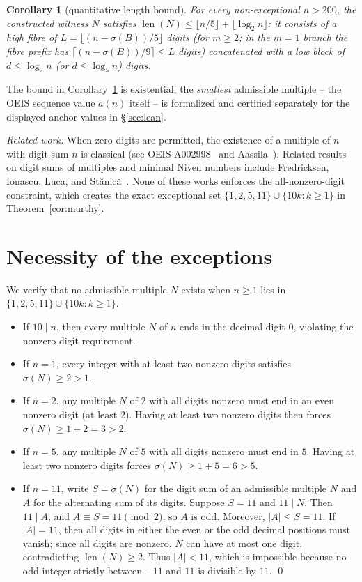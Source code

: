 \documentclass[11pt]{article}
\newtheorem{corollary}[theorem]{Corollary}
\theoremstyle{remark}
\newcommand{\sig}{\sigma}
\begin{document}
\begin{corollary}[quantitative length bound]
\label{cor:quant}
For every non-exceptional $n > 200$, the constructed witness $N$ satisfies
$\operatorname{len}(N) \le \lfloor n/5 \rfloor + \lfloor \log_2 n \rfloor$:
it consists of a high fibre of $L = \lfloor (n-\sig(B))/5 \rfloor$ digits
(for $m \ge 2$; in the $m = 1$ branch the fibre prefix has
$\lceil (n-\sig(B))/9 \rceil \le L$ digits)
concatenated with a low block of $d \le \log_2 n$ (or $d \le \log_5 n$) digits.
\end{corollary}

The bound in Corollary~\ref{cor:quant} is existential; the \emph{smallest}
admissible multiple -- the OEIS sequence value $a(n)$ itself -- is formalized
and certified separately for the displayed anchor values in \S\ref{sec:lean}.

\emph{Related work.} When zero digits are permitted, the existence of a
multiple of $n$ with digit sum $n$ is classical (see OEIS A002998~\cite{a002998}
and Aassila~\cite{aassila}). Related results on digit sums of multiples and
minimal Niven numbers include Fredricksen, Ionascu, Luca, and
St\u{a}nic\u{a}~\cite{fils}. None of these works enforces the all-nonzero-digit
constraint, which creates the exact exceptional set
$\{1,2,5,11\} \cup \{10k : k \ge 1\}$ in Theorem~\ref{cor:murthy}.

\section{Necessity of the exceptions}
\label{sec:exc}

We verify that no admissible multiple $N$ exists when $n \ge 1$ lies in
$\{1,2,5,11\} \cup \{10k : k \ge 1\}$.

\begin{itemize}
\item If $10 \mid n$, then every multiple $N$ of $n$ ends in the decimal digit
$0$, violating the nonzero-digit requirement.
\item If $n = 1$, every integer with at least two nonzero digits satisfies
$\sig(N) \ge 2 > 1$.
\item If $n = 2$, any multiple $N$ of $2$ with all digits nonzero must end in
an even nonzero digit (at least $2$). Having at least two nonzero digits then
forces $\sig(N) \ge 1 + 2 = 3 > 2$.
\item If $n = 5$, any multiple $N$ of $5$ with all digits nonzero must end in
$5$. Having at least two nonzero digits forces $\sig(N) \ge 1 + 5 = 6 > 5$.
\item If $n = 11$, write $S = \sig(N)$ for the digit sum of an admissible
multiple $N$ and $A$ for the alternating sum of its digits. Suppose $S = 11$
and $11 \mid N$. Then $11 \mid A$, and $A \equiv S = 11 \pmod 2$, so $A$ is
odd. Moreover, $|A| \le S = 11$. If $|A| = 11$, then all digits in either the
even or the odd decimal positions must vanish; since all digits are nonzero,
$N$ can have at most one digit, contradicting $\operatorname{len}(N) \ge 2$.
Thus $|A| < 11$, which is impossible because no odd integer strictly between
$-11$ and $11$ is divisible by $11$. \qed
\end{itemize}
\end{document}
